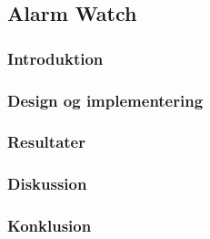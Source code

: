 {
    \newcommand{\labelprefix}{src6-4}

\subsection{Alarm Watch}

\subsubsection{Introduktion}

\subsubsection{Design og implementering}

\subsubsection{Resultater}


\subsubsection{Diskussion}

\subsubsection{Konklusion}
   
}